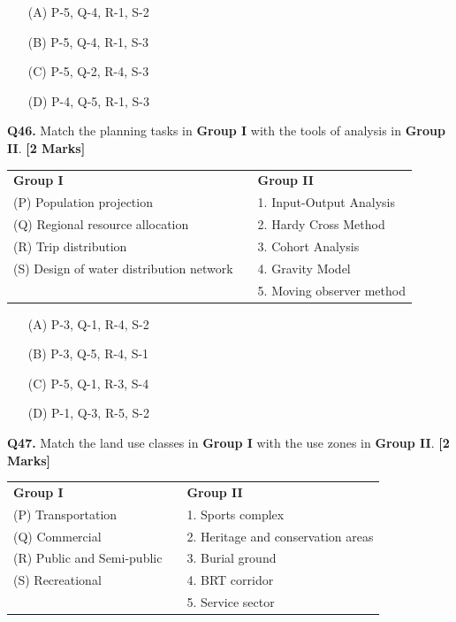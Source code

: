 \documentclass[11pt]{article}
\newcommand{\questionb}[2]{
    \noindent\textbf{Q#2.} #1 \hfill \textbf{[2 Marks]}
}
\begin{document}
\begin{enumerate}
    \item[(A)] P-5, Q-4, R-1, S-2
    \item[(B)] P-5, Q-4, R-1, S-3  
    \item[(C)] P-5, Q-2, R-4, S-3
    \item[(D)] P-4, Q-5, R-1, S-3
\end{enumerate}

\vspace{0.5cm}

\questionb{Match the planning tasks in \textbf{Group I} with the tools of analysis in \textbf{Group II}.}{46}

\begin{tabularx}{\linewidth}{lXl}
\textbf{Group I} & & \textbf{Group II} \\
(P) Population projection & & 1. Input-Output Analysis \\
(Q) Regional resource allocation & & 2. Hardy Cross Method \\
(R) Trip distribution & & 3. Cohort Analysis \\
(S) Design of water distribution network & & 4. Gravity Model \\
& & 5. Moving observer method \\
\end{tabularx}

\begin{enumerate}
    \item[(A)] P-3, Q-1, R-4, S-2
    \item[(B)] P-3, Q-5, R-4, S-1  
    \item[(C)] P-5, Q-1, R-3, S-4
    \item[(D)] P-1, Q-3, R-5, S-2
\end{enumerate}

\vspace{0.5cm}

\questionb{Match the land use classes in \textbf{Group I} with the use zones in \textbf{Group II}.}{47}

\begin{tabularx}{\linewidth}{lXl}
\textbf{Group I} & & \textbf{Group II} \\
(P) Transportation & & 1. Sports complex \\
(Q) Commercial & & 2. Heritage and conservation areas \\
(R) Public and Semi-public & & 3. Burial ground \\
(S) Recreational & & 4. BRT corridor \\
& & 5. Service sector \\
\end{tabularx}
\end{document}
